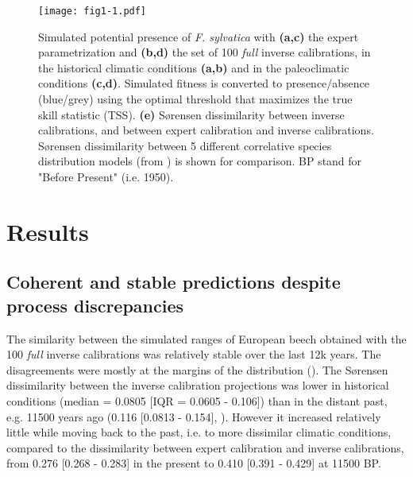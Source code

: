 \documentclass[letterpaper,8pt]{extarticle}  %
\begin{document}
\begin{doublespacing}
\begin{linenumbers}

\begin{figure}[h]
\centering
\begin{subcaptiongroup}
\label{fig:1A} 
\label{fig:1B}
\label{fig:1C}
\label{fig:1D}
\label{fig:1E}
\end{subcaptiongroup}
\texttt{[image: fig1-1.pdf]}
\caption{Simulated potential presence of \emph{F. sylvatica} with \textbf{(a,c)} the expert parametrization and \textbf{(b,d)} the set of 100 \emph{full} inverse calibrations, in the historical climatic conditions \textbf{(a,b)} and in the paleoclimatic conditions \textbf{(c,d)}. Simulated fitness is converted to presence/absence (blue/grey) using the optimal threshold that maximizes the true skill statistic (TSS). \textbf{(e)} S\o rensen dissimilarity between inverse calibrations, and between expert calibration and inverse calibrations. S\o rensen dissimilarity between 5 different correlative species distribution models (from \citealp{VanderMeersch2024}) is shown for comparison. BP stand for "Before Present" (i.e. 1950).}
\label{fig:1}
\end{figure}



\section{Results}

\subsection{Coherent and stable predictions despite process discrepancies}

The similarity between the simulated ranges of European beech obtained with the 100 \emph{full} inverse calibrations was relatively stable over the last 12k years. The disagreements were mostly at the margins of the distribution (). The S\o rensen dissimilarity between the inverse calibration projections was lower in historical conditions (median = 0.0805 [IQR = 0.0605 - 0.106]) than in the distant past, e.g. 11500 years ago (0.116 [0.0813 - 0.154], ). However it increased relatively little while moving back to the past, i.e. to more dissimilar climatic conditions, compared to the dissimilarity between expert calibration and inverse calibrations, from 0.276 [0.268 - 0.283] in the present to 0.410 [0.391 - 0.429] at 11500 BP.


\end{linenumbers}
\end{doublespacing}
\end{document}
